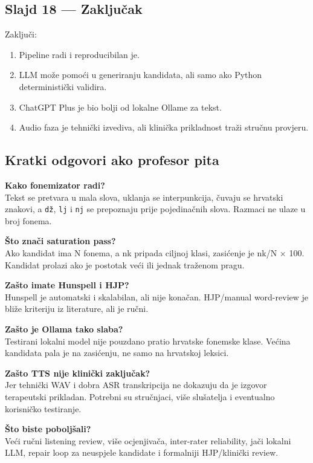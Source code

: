 \documentclass[
]{article}
\providecommand{\tightlist}{%
  \setlength{\itemsep}{0pt}\setlength{\parskip}{0pt}}
\begin{document}
\subsection{Slajd 18 --- Zaključak}\label{slajd-18-zakljuux10dak}

Zaključi:

\begin{enumerate}
\def\labelenumi{\arabic{enumi}.}
\tightlist
\item
  Pipeline radi i reproducibilan je.
\item
  LLM može pomoći u generiranju kandidata, ali samo ako Python
  deterministički validira.
\item
  ChatGPT Plus je bio bolji od lokalne Ollame za tekst.
\item
  Audio faza je tehnički izvediva, ali klinička prikladnost traži
  stručnu provjeru.
\end{enumerate}

\subsection{Kratki odgovori ako profesor
pita}\label{kratki-odgovori-ako-profesor-pita}

\textbf{Kako fonemizator radi?}\\
Tekst se pretvara u mala slova, uklanja se interpunkcija, čuvaju se
hrvatski znakovi, a \texttt{dž}, \texttt{lj} i \texttt{nj} se prepoznaju
prije pojedinačnih slova. Razmaci ne ulaze u broj fonema.

\textbf{Što znači saturation pass?}\\
Ako kandidat ima N fonema, a nk pripada ciljnoj klasi, zasićenje je nk/N
× 100. Kandidat prolazi ako je postotak veći ili jednak traženom pragu.

\textbf{Zašto imate Hunspell i HJP?}\\
Hunspell je automatski i skalabilan, ali nije konačan. HJP/manual
word-review je bliže kriteriju iz literature, ali je ručni.

\textbf{Zašto je Ollama tako slaba?}\\
Testirani lokalni model nije pouzdano pratio hrvatske fonemske klase.
Većina kandidata pala je na zasićenju, ne samo na hrvatskoj leksici.

\textbf{Zašto TTS nije klinički zaključak?}\\
Jer tehnički WAV i dobra ASR transkripcija ne dokazuju da je izgovor
terapeutski prikladan. Potrebni su stručnjaci, više slušatelja i
eventualno korisničko testiranje.

\textbf{Što biste poboljšali?}\\
Veći ručni listening review, više ocjenjivača, inter-rater reliability,
jači lokalni LLM, repair loop za neuspjele kandidate i formalniji
HJP/klinički review.
\end{document}
